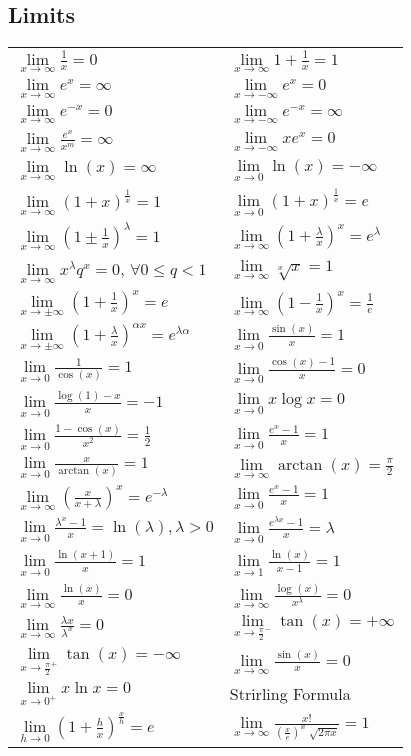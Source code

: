 \documentclass[a4paper, 10pt]{article}
\theoremstyle{definition}
\theoremstyle{ex}
\theoremstyle{named}
\begin{document}
\subsection*{Limits}
\newcommand{\limxi}{\lim\limits_{x\to\infty}}
\newcommand{\limxni}{\lim\limits_{x\to-\infty}}
\newcommand{\limx}{\lim\limits_{x\to\pm\infty}}
\newcommand{\limxz}{\lim\limits_{x\to0}}
\renewcommand{\arraystretch}{1.8}
\begin{tabularx}{\linewidth}{XX}
    $\limxi \frac{1}{x} = 0$ & $\limxi 1 + \frac{1}{x} = 1$ \\
    $\limxi e^x = \infty$ & $\limxni e^x = 0$ \\
    $\limxi e^{-x} = 0$ & $\limxni e^{-x} = \infty$ \\
    $\limxi \frac{e^x}{x^m} = \infty$ & $\limxni xe^x = 0$ \\
    $\limxi \ln(x) = \infty$ & $\limxz \ln(x) = -\infty$ \\
    $\limxi (1 + x)^\frac{1}{x} = 1$ & $\limxz (1 + x)^\frac{1}{x} = e$ \\
    $\limxi (1 \pm \frac{1}{x})^\lambda = 1$ & $\limxi (1 + \frac{\lambda}{x})^x = e^\lambda$ \\
    $\limxi x^\lambda q^x = 0$, $\forall 0 \leq q < 1$ & $\limxi \sqrt[x]{x} = 1$ \\
    $\limx (1 + \frac{1}{x})^x = e$ & $\limxi (1 - \frac{1}{x})^x = \frac{1}{e}$ \\
    $\limx (1 + \frac{\lambda}{x})^{\alpha x} = e^{\lambda \alpha}$ & $\limxz \frac{\sin(x)}{x} = 1$ \\
    $\limxz \frac{1}{\cos(x)} = 1$ & $\limxz \frac{\cos(x) - 1}{x} = 0$ \\
    $\limxz \frac{\log(1) - x}{x} = -1$ & $\limxz x \log x = 0$ \\
    $\limxz \frac{1 - \cos(x)}{x^2} = \frac{1}{2}$ & $\limxz \frac{e^x - 1}{x} = 1$ \\
    $\limxz \frac{x}{\arctan(x)} = 1$ & $\limxi \arctan(x) = \frac{\pi}{2}$ \\
    $\limxi (\frac{x}{x + \lambda})^x = e^{-\lambda}$ & $\limxz \frac{e^x - 1}{x} = 1$ \\
    $\limxz \frac{\lambda^x - 1}{x} = \ln(\lambda), \lambda > 0$ & $\limxz \frac{e^{\lambda x} - 1}{x} = \lambda$ \\
    $\limxz \frac{\ln(x+1)}{x} = 1$ & $\lim\limits_{x \to 1} \frac{\ln(x)}{x - 1} = 1$ \\
    $\limxi \frac{\ln(x)}{x} = 0$ & $\limxi \frac{\log(x)}{x^\lambda} = 0$ \\
    $\limxi \frac{\lambda x}{\lambda^x} = 0$ & $\lim\limits_{x \to \frac{\pi}{2}^-} \tan(x) = +\infty$\\
    $\lim\limits_{x \to \frac{\pi}{2}^+} \tan(x) = -\infty$ & $\limxi \frac{\sin(x)}{x} = 0$ \\
    $\lim\limits_{x \to 0^+} x \ln x = 0$ & Strirling Formula \\
    $\lim\limits_{h \to 0} (1 + \frac{h}{x})^{\frac{x}{h}} = e$ & $\limxi \frac{x!}{(\frac{x}{e})^x \sqrt[]{2 \pi x}} = 1$
\end{tabularx}
\end{document}
